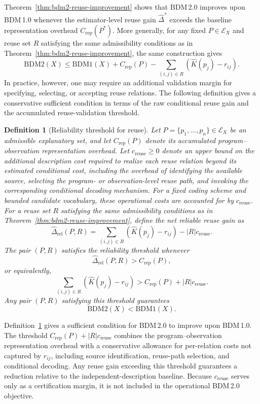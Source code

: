 \documentclass{article}
\newtheorem{definition}{Definition}
\begin{document}
Theorem~\ref{thm:bdm2-reuse-improvement} shows that BDM\,2.0 improves upon BDM\,1.0 whenever the estimator-level reuse gain \(\hat{\Delta}^*\) exceeds the baseline representation overhead \(C_{\mathrm{rep}}(P^*)\). More generally, for any fixed \(P\in\mathcal E_X\) and reuse set \(R\) satisfying the same admissibility conditions as in Theorem~\ref{thm:bdm2-reuse-improvement}, the same construction gives
\[
\mathrm{BDM2}(X)
\leq
\mathrm{BDM1}(X)
+
C_{\mathrm{rep}}(P)
-
\sum_{(i,j)\in R}
\left(
\hat K(p_j)-r_{ij}
\right).
\]
In practice, however, one may require an additional validation margin for specifying, selecting, or accepting reuse relations. The following definition gives a conservative sufficient condition in terms of the raw conditional reuse gain and the accumulated reuse-validation threshold.

\begin{definition}[Reliability threshold for reuse]
\label{def:bdm2-reliability-threshold}
Let \(P=\{p_1,\ldots,p_n\}\in\mathcal E_X\) be an admissible explanatory set, and let \(C_{\mathrm{rep}}(P)\) denote its accumulated program--observation representation overhead. Let \(c_{\mathrm{reuse}}\geq 0\) denote an upper bound on the additional description cost required to realize each reuse relation beyond its estimated conditional cost, including the overhead of identifying the available source, selecting the program- or observation-level reuse path, and invoking the corresponding conditional decoding mechanism. For a fixed coding scheme and bounded candidate vocabulary, these operational costs are accounted for by \(c_{\mathrm{reuse}}\). For a reuse set \(R\) satisfying the same admissibility conditions as in Theorem~\ref{thm:bdm2-reuse-improvement}, define the net reliable reuse gain as
\[
\hat{\Delta}_{\mathrm{rel}}(P,R)
=
\sum_{(i,j)\in R}
\left(
\hat K(p_j)-r_{ij}
\right)
-
|R|c_{\mathrm{reuse}}.
\]
The pair \((P,R)\) satisfies the reliability threshold whenever
\[
\hat{\Delta}_{\mathrm{rel}}(P,R)
>
C_{\mathrm{rep}}(P),
\]
or equivalently,
\[
\sum_{(i,j)\in R}
\left(
\hat K(p_j)-r_{ij}
\right)
>
C_{\mathrm{rep}}(P)
+
|R|c_{\mathrm{reuse}}.
\]
Any pair \((P,R)\) satisfying this threshold guarantees
\[
\mathrm{BDM2}(X)
<
\mathrm{BDM1}(X).
\]
\end{definition}
Definition~\ref{def:bdm2-reliability-threshold} gives a sufficient condition for BDM\,2.0 to improve upon BDM\,1.0. The threshold \(C_{\mathrm{rep}}(P)+|R|c_{\mathrm{reuse}}\) combines the program--observation representation overhead with a conservative allowance for per-relation costs not captured by \(r_{ij}\), including source identification, reuse-path selection, and conditional decoding. Any reuse gain exceeding this threshold guarantees a reduction relative to the independent-description baseline. Because \(c_{\mathrm{reuse}}\) serves only as a certification margin, it is not included in the operational BDM\,2.0 objective.
\end{document}

